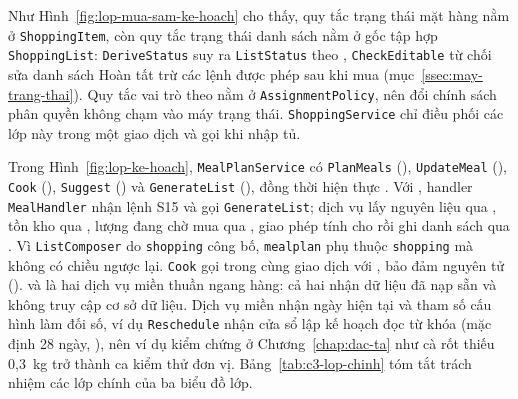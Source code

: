 
Như Hình~\ref{fig:lop-mua-sam-ke-hoach} cho thấy, quy tắc trạng thái mặt hàng nằm ở \texttt{ShoppingItem}, còn quy tắc trạng thái danh sách nằm ở gốc tập hợp \texttt{ShoppingList}: \texttt{DeriveStatus} suy ra \texttt{ListStatus} theo , \texttt{CheckEditable} từ chối sửa danh sách Hoàn tất trừ các lệnh được phép sau khi mua (mục~\ref{ssec:may-trang-thai}). Quy tắc vai trò theo  nằm ở \texttt{AssignmentPolicy}, nên đổi chính sách phân quyền không chạm vào máy trạng thái. \texttt{ShoppingService} chỉ điều phối các lớp này trong một giao dịch và gọi  khi nhập tủ.


Trong Hình~\ref{fig:lop-ke-hoach}, \texttt{MealPlanService} có \texttt{PlanMeals} (), \texttt{UpdateMeal} (), \texttt{Cook} (), \texttt{Suggest} () và \texttt{GenerateList} (), đồng thời hiện thực . Với , handler \texttt{MealHandler} nhận lệnh S15 và gọi \texttt{GenerateList}; dịch vụ lấy nguyên liệu qua , tồn kho qua , lượng đang chờ mua qua , giao phép tính cho  rồi ghi danh sách qua . Vì \texttt{ListComposer} do \texttt{shopping} công bố, \texttt{mealplan} phụ thuộc \texttt{shopping} mà không có chiều ngược lại. \texttt{Cook} gọi  trong cùng giao dịch với , bảo đảm  nguyên tử ().  và  là hai dịch vụ miền thuần ngang hàng: cả hai nhận dữ liệu đã nạp sẵn và không truy cập cơ sở dữ liệu. Dịch vụ miền nhận ngày hiện tại và tham số cấu hình làm đối số, ví dụ \texttt{Reschedule} nhận cửa sổ lập kế hoạch đọc từ khóa  (mặc định 28 ngày, ), nên ví dụ kiểm chứng ở Chương~\ref{chap:dac-ta} như cà rốt thiếu 0,3~kg trở thành ca kiểm thử đơn vị. Bảng~\ref{tab:c3-lop-chinh} tóm tắt trách nhiệm các lớp chính của ba biểu đồ lớp.

